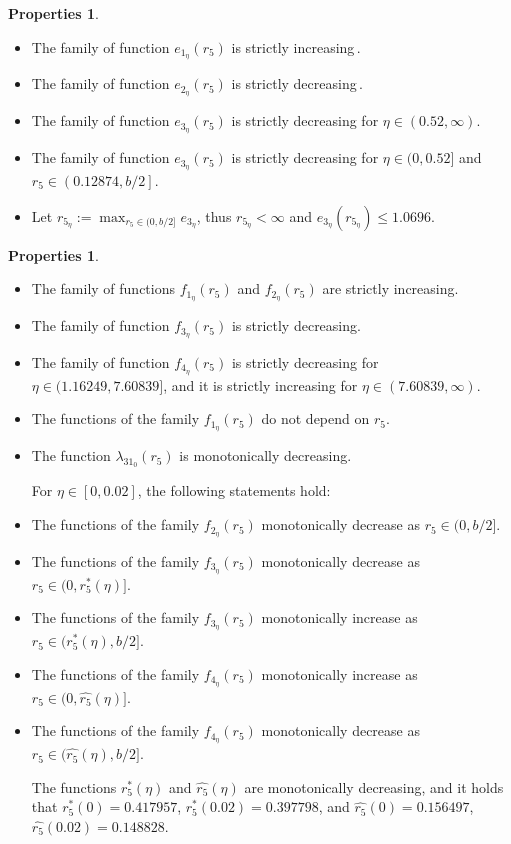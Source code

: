 \documentclass[final,11pt]{article}
\numberwithin{equation}{section}
\theoremstyle{definition}
\newtheorem{properties}[theorem]{Properties}
\begin{document}
\begin{properties}\label{es}{$ $}
\begin{itemize}
\item The family of function $e_{1_{\eta}}(r_{5})$ is strictly increasing\,. 
\item The family of function $e_{2_{\eta}}(r_{5})$ is strictly decreasing\,. 
\item The family of function $e_{3_{\eta}}(r_{5})$ is strictly decreasing for $\eta\in(0.52,\infty)$.
\item The family of function $e_{3_{\eta}}(r_{5})$ is strictly decreasing for $\eta\in(0,0.52] $ and $r_{5}\in\left(0.12874,b/2\right]$.
\item Let $r_{5_{\eta}}:=\displaystyle \max_{r_{5}\in(0,b/2]}e_{3_{\eta}}$, thus $r_{5_{\eta}}<\infty$ and $e_{3_{\eta}}(r_{5_{\eta}})\leq 1.0696$.
\end{itemize}
\end{properties}

\begin{properties}\label{fs}{$ $}
\begin{itemize}
Below are the properties of the functions with respect to the variable $r_5$ and parameter $\eta$:

\item The family of functions $f_{1_{\eta}}(r_{5})$ and $f_{2_{\eta}}(r_{5})$ are strictly increasing.
\item The family of function $f_{3_{\eta}}(r_{5})$ is strictly decreasing.
\item The family of function $f_{4_{\eta}}(r_{5})$ is strictly decreasing for $\eta\in(1.16249,7.60839]$, and it is strictly increasing for $\eta\in(7.60839,\infty)$.
\item The functions of the family $f_{1_{\eta}}(r_{5})$ do not depend on $r_{5}$.
\item The function $\lambda_{31_{0}}(r_{5})$ is monotonically decreasing.

For $\eta\in[0,0.02]$, the following statements hold:
\item The functions of the family $f_{2_{\eta}}(r_{5})$ monotonically decrease as $r_{5}\in(0,b/2]$.
\item The functions of the family $f_{3_{\eta}}(r_{5})$ monotonically decrease as $r_{5}\in(0,r_{5}^{*}(\eta)]$.
\item The functions of the family $f_{3_{\eta}}(r_{5})$ monotonically increase as $r_{5}\in(r_{5}^{*}(\eta),b/2]$.
\item The functions of the family $f_{4_{\eta}}(r_{5})$ monotonically increase as $r_{5}\in(0,\hat{r_{5}}(\eta)]$.
\item The functions of the family $f_{4_{\eta}}(r_{5})$ monotonically decrease as $r_{5}\in(\hat{r_{5}}(\eta),b/2]$.

The functions $r_{5}^{*}(\eta)$ and $\hat{r_{5}}(\eta)$ are monotonically decreasing, and it holds that $r_{5}^{*}(0)=0.417957$, $r_{5}^{*}(0.02)=0.397798$, and $\hat{r_{5}}(0)=0.156497$, $\hat{r_{5}}(0.02)=0.148828$.
\end{itemize}
\end{properties}
\end{document}
